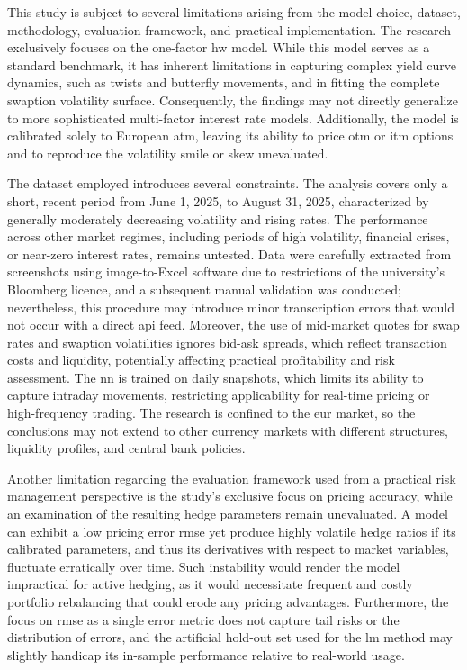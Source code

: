 This study is subject to several limitations arising from the model choice, dataset, methodology, evaluation framework, and practical implementation. The research exclusively focuses on the one-factor \ac{hw} model. While this model serves as a standard benchmark, it has inherent limitations in capturing complex yield curve dynamics, such as twists and butterfly movements, and in fitting the complete swaption volatility surface. Consequently, the findings may not directly generalize to more sophisticated multi-factor interest rate models. Additionally, the model is calibrated solely to European \ac{atm}, leaving its ability to price \ac{otm} or \ac{itm} options and to reproduce the volatility smile or skew unevaluated.

The dataset employed introduces several constraints. The analysis covers only a short, recent period from June 1, 2025, to August 31, 2025, characterized by generally moderately decreasing volatility and rising rates. The performance across other market regimes, including periods of high volatility, financial crises, or near-zero interest rates, remains untested. Data were carefully extracted from screenshots using image-to-Excel software due to restrictions of the university's Bloomberg licence, and a subsequent manual validation was conducted; nevertheless, this procedure may introduce minor transcription errors that would not occur with a direct \ac{api} feed. Moreover, the use of mid-market quotes for swap rates and swaption volatilities ignores bid-ask spreads, which reflect transaction costs and liquidity, potentially affecting practical profitability and risk assessment. The \ac{nn} is trained on daily snapshots, which limits its ability to capture intraday movements, restricting applicability for real-time pricing or high-frequency trading. The research is confined to the \ac{eur} market, so the conclusions may not extend to other currency markets with different structures, liquidity profiles, and central bank policies.

Another limitation regarding the evaluation framework used from a practical risk management perspective is the study's exclusive focus on pricing accuracy, while an examination of the resulting hedge parameters remain unevaluated. A model can exhibit a low pricing error \ac{rmse} yet produce highly volatile hedge ratios if its calibrated parameters, and thus its derivatives with respect to market variables, fluctuate erratically over time. Such instability would render the model impractical for active hedging, as it would necessitate frequent and costly portfolio rebalancing that could erode any pricing advantages. Furthermore, the focus on \ac{rmse} as a single error metric does not capture tail risks or the distribution of errors, and the artificial hold-out set used for the \ac{lm} method may slightly handicap its in-sample performance relative to real-world usage.

